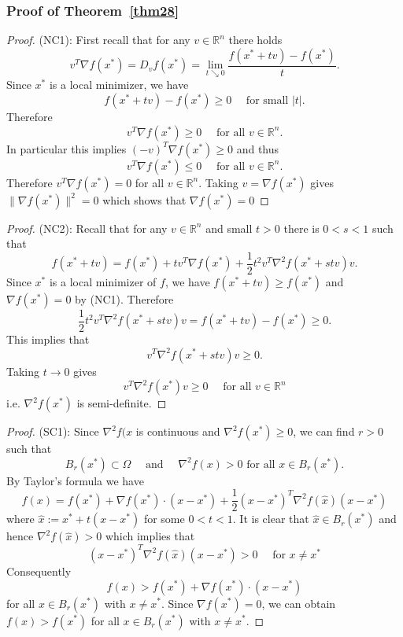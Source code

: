 \subsubsection{Proof of Theorem~\ref{thm28}}
\label{appendix:thm28}
\begin{proof}
(NC1): First recall that for any $v \in \mathbb{R}^n$ there holds
$$
v^{T} \nabla f\left(x^{*}\right)=D_{v} f\left(x^{*}\right)=\lim _{t \searrow 0} \frac{f\left(x^{*}+t v\right)-f\left(x^{*}\right)}{t}.
$$
Since $x^*$ is a local minimizer, we have
$$
f\left(x^{*}+t v\right)-f\left(x^{*}\right) \geq 0 \quad \textrm { for small }|t|.
$$
Therefore
$$
v^{T} \nabla f\left(x^{*}\right) \geq 0 \quad \textrm { for all } v \in \mathbb{R}^{n}.
$$
In particular this implies $(-v)^{T} \nabla f\left(x^{*}\right) \geq 0$ and thus 
$$
v^{T} \nabla f\left(x^{*}\right) \leq 0 \quad \textrm { for all } v \in \mathbb{R}^{n}.
$$
Therefore $v^{T} \nabla f(x^{*})=0$ for all $v \in \mathbb{R}^{n}$. Taking $v=\nabla f(x^*)$ gives $\|\nabla f(x^*)\|^2 = 0$ which shows that $\nabla f(x^{*})=0$ 
\end{proof}
\begin{proof}
(NC2): Recall that for any $v \in \mathbb{R}^n$ and small $t > 0$ there is $0 < s < 1$ such that 
$$
f\left(x^{*}+t v\right)=f\left(x^{*}\right)+t v^{T} \nabla f\left(x^{*}\right)+\frac{1}{2} t^{2} v^{T} \nabla^{2} f\left(x^{*}+s t v\right) v.
$$
Since $x^*$ is a local minimizer of $f$, we have $f\left(x^{*}+t v\right) \geq f\left(x^{*}\right)$ and $\nabla f(x^{*})=0$ by (NC1). Therefore
$$
\frac{1}{2} t^{2} v^{T} \nabla^{2} f\left(x^{*}+s t v\right) v=f\left(x^{*}+t v\right)-f\left(x^{*}\right) \geq 0 .
$$
This implies that
$$
v^{T} \nabla^{2} f\left(x^{*}+s t v\right) v \geq 0.
$$
Taking $t \rightarrow 0$ gives
$$
v^{T} \nabla^{2} f\left(x^{*}\right) v \geq 0 \quad \textrm { for all } v \in \mathbb{R}^{n}
$$ 
i.e. $\nabla^2 f(x^*)$ is semi-definite.
\end{proof}
\begin{proof}
(SC1): Since $\nabla^2 f(x$ is continuous and $\nabla^2 f(x^*) \geq 0$, we can find $r > 0$ such that
$$
B_{r}\left(x^{*}\right) \subset \Omega \quad \textrm { and } \quad \nabla^{2} f(x)>0 \textrm { for all } x \in B_{r}\left(x^{*}\right).
$$
By Taylor’s formula we have
$$
f(x)=f\left(x^{*}\right)+\nabla f\left(x^{*}\right) \cdot\left(x-x^{*}\right)+\frac{1}{2}\left(x-x^{*}\right)^{T} \nabla^{2} f(\hat{x})\left(x-x^{*}\right)
$$
where $\hat{x} := x^* + t(x - x^*)$ for some $0 < t < 1$.
It is clear that $\hat{x} \in B_{r}\left(x^{*}\right)$ and hence $\nabla^2f(\hat{x}) > 0$ which implies that 
$$
\left(x-x^{*}\right)^{T} \nabla^{2} f(\hat{x})\left(x-x^{*}\right)>0 \quad \textrm { for } x \neq x^{*}
$$
Consequently
$$
f(x)>f\left(x^{*}\right)+\nabla f\left(x^{*}\right) \cdot\left(x-x^{*}\right)
$$
for all $x \in B_{r}\left(x^{*}\right)$ with $x \neq x^*$. Since $\nabla f(x^*) = 0$, we can obtain $f(x) > f(x^*)$ for all $x \in B_{r}\left(x^{*}\right)$ with $x \neq x^*$. 
\end{proof}

